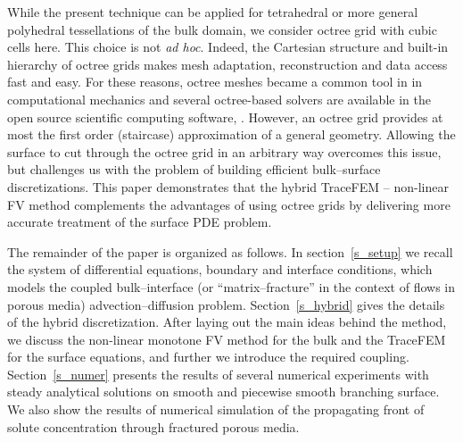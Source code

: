 \documentclass{article}
\begin{document}
While the present technique can be applied for tetrahedral or more general polyhedral  tessellations of the bulk domain, we consider octree grid with cubic cells here. This choice is not \textit{ad hoc}. Indeed, the Cartesian structure and built-in hierarchy of octree grids makes mesh adaptation, reconstruction and data access fast and easy. For these reasons, octree meshes became a common tool in  %
in computational mechanics and  several octree-based solvers  are available in the open source scientific computing software, \cite{DEAL2,Pop03}. However, an octree grid provides {at most} the first order (staircase) approximation of a general geometry. Allowing the surface to cut through the octree grid in an arbitrary way overcomes this issue, but challenges us with the problem of building efficient bulk--surface discretizations.   This paper demonstrates that the hybrid TraceFEM -- non-linear FV method complements the advantages of using octree grids by delivering {more accurate treatment of the surface PDE problem}. %

The remainder of the paper is organized as follows. In section~\ref{s_setup} we recall the system of differential equations, boundary and interface conditions, which models the coupled bulk--interface (or ``matrix--fracture'' in the context of flows in porous media) advection--diffusion problem. Section~\ref{s_hybrid} gives the details of the hybrid discretization.
After laying out the main ideas behind the method, we discuss the non-linear monotone FV method for the bulk and the TraceFEM for
the surface equations, and further we introduce the required coupling.  Section~\ref{s_numer} presents the results of several numerical experiments with steady analytical solutions on  smooth and piecewise smooth branching surface. We also show the results of numerical simulation of the propagating front of solute concentration through fractured porous media.  %

\end{document}
